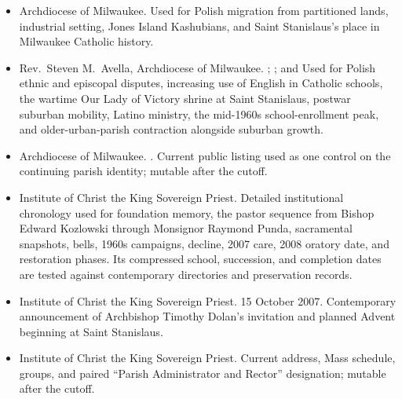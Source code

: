 \begin{itemize}[leftmargin=1.35em,itemsep=0.2em,topsep=0.2em]
\item Archdiocese of Milwaukee.  Used for Polish migration from partitioned lands, industrial setting, Jones Island Kashubians, and Saint Stanislaus's place in Milwaukee Catholic history.
\item Rev.~Steven M.~Avella, Archdiocese of Milwaukee. ; ; and  Used for Polish ethnic and episcopal disputes, increasing use of English in Catholic schools, the wartime Our Lady of Victory shrine at Saint Stanislaus, postwar suburban mobility, Latino ministry, the mid-1960s school-enrollment peak, and older-urban-parish contraction alongside suburban growth.
\item Archdiocese of Milwaukee. . Current public listing used as one control on the continuing parish identity; mutable after the cutoff.
\item Institute of Christ the King Sovereign Priest.  Detailed institutional chronology used for foundation memory, the pastor sequence from Bishop Edward Kozlowski through Monsignor Raymond Punda, sacramental snapshots, bells, 1960s campaigns, decline, 2007 care, 2008 oratory date, and restoration phases. Its compressed school, succession, and completion dates are tested against contemporary directories and preservation records.
\item Institute of Christ the King Sovereign Priest.  15 October 2007. Contemporary announcement of Archbishop Timothy Dolan's invitation and planned Advent beginning at Saint Stanislaus.
\item Institute of Christ the King Sovereign Priest.  Current address, Mass schedule, groups, and paired ``Parish Administrator and Rector'' designation; mutable after the cutoff.

\end{itemize}
